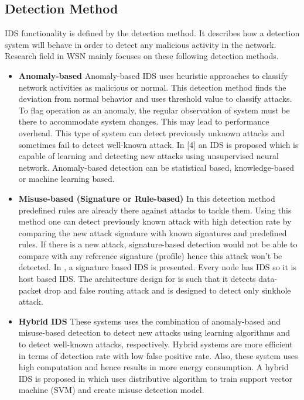 \subsection{Detection Method}
IDS functionality is defined by the detection method. It describes how a detection system will behave in order to detect any malicious activity in the network. Research field in WSN mainly focuses on these following detection methods.
\begin{itemize}
  \item{\textbf{Anomaly-based} Anomaly-based IDS uses heuristic approaches to classify network activities as malicious or normal. This detection method finds the deviation from normal behavior and uses threshold value to classify attacks. To flag operation as an anomaly, the regular observation of system must be there to accommodate system changes. This may lead to performance overhead. This type of system can detect previously unknown attacks and sometimes fail to detect well-known attack. In [4] an IDS is proposed which is capable of learning and detecting new attacks using unsupervised neural network. Anomaly-based detection can be statistical based, knowledge-based or machine learning based.}
  \item{\textbf{Misuse-based (Signature or Rule-based)} In this detection method predefined rules are already there against attacks to tackle them. Using this method one can detect previously known attack with high detection rate by comparing the new attack signature with known signatures and predefined rules. If there is a new attack, signature-based detection would not be able to compare with any reference signature (profile) hence this attack won’t be detected. In \cite{ioannis2007towards, krontiris2007intrusion}, a signature based IDS is presented. Every node has IDS so it is host based IDS. The architecture design for \cite{ioannis2007towards} is such that it detects data-packet drop and false routing attack and \cite{krontiris2007intrusion} is designed to detect only sinkhole attack.}
  \item{\textbf{Hybrid IDS} These systems uses the combination of anomaly-based and misuse-based detection to detect new attacks using learning algorithms and  to detect well-known attacks, respectively. Hybrid systems are more efficient in terms of detection rate with low false positive rate. Also, these system uses high computation and hence results in more energy consumption. A hybrid IDS is proposed in \cite{li2008intruder} which uses distributive algorithm to train support vector machine (SVM) and create misuse detection model.}
\end{itemize}
